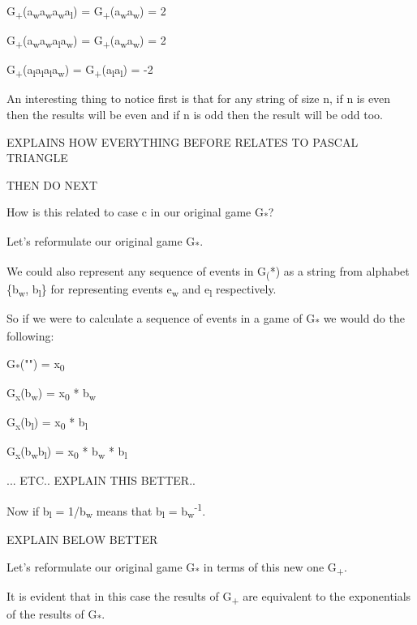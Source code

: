 \documentclass[12pt,reqno]{amsart}
\begin{document}
G\textsubscript{+}(a\textsubscript{w}a\textsubscript{w}a\textsubscript{w}a\textsubscript{l}) = G\textsubscript{+}(a\textsubscript{w}a\textsubscript{w}) =  2

G\textsubscript{+}(a\textsubscript{w}a\textsubscript{w}a\textsubscript{l}a\textsubscript{w}) = G\textsubscript{+}(a\textsubscript{w}a\textsubscript{w}) = 2

G\textsubscript{+}(a\textsubscript{l}a\textsubscript{l}a\textsubscript{l}a\textsubscript{w}) = G\textsubscript{+}(a\textsubscript{l}a\textsubscript{l}) = -2

An interesting thing to notice first is that for any string of size n, if n is even then the results will be even and if n is odd then the result will be odd too.

EXPLAINS HOW EVERYTHING BEFORE RELATES TO PASCAL TRIANGLE

THEN DO NEXT


How is this related to case c in our original game G\textsubscript{*}?


Let's reformulate our original game G\textsubscript{*}.

We could also represent any sequence of events in G\textsubscript(*) as a string from alphabet \{b\textsubscript{w}, b\textsubscript{l}\} for representing events e\textsubscript{w} and e\textsubscript{l} respectively.

So if we were to calculate a sequence of events in a game of G\textsubscript{*} we would do the following:

G\textsubscript{*}("") = x\textsubscript{0}

G\textsubscript{x}(b\textsubscript{w}) = x\textsubscript{0} * b\textsubscript{w}

G\textsubscript{x}(b\textsubscript{l}) = x\textsubscript{0} * b\textsubscript{l}

G\textsubscript{x}(b\textsubscript{w}b\textsubscript{l}) = x\textsubscript{0} * b\textsubscript{w} * b\textsubscript{l}

... ETC.. EXPLAIN THIS BETTER..

Now if b\textsubscript{l} = 1/b\textsubscript{w} means that b\textsubscript{l} = b\textsubscript{w}\textsuperscript{-1}.

EXPLAIN BELOW BETTER

Let's reformulate our original game G\textsubscript{*} in terms of this new one G\textsubscript{+}.

It is evident that in this case the results of G\textsubscript{+} are equivalent to the exponentials of the results of G\textsubscript{*}.
\end{document}
